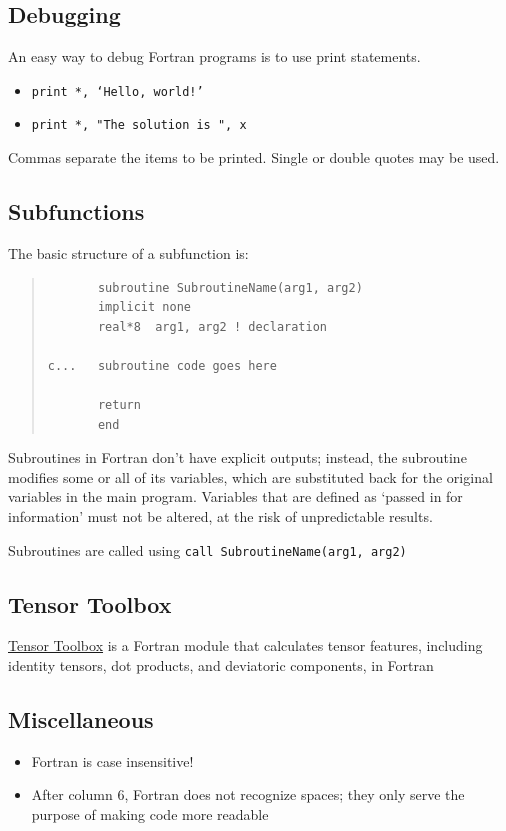 \documentclass[10pt,letterpaper,oneside]{report}
\begin{document}
\subsection{Debugging}
An easy way to debug Fortran programs is to use print statements. 
\begin{itemize}
\item \texttt{print *, `Hello, world!'}
\item \texttt{print *, "The solution is ", x}
\end{itemize} 
Commas separate the items to be printed.  Single or double quotes may be used.

\subsection{Subfunctions}
The basic structure of a subfunction is: 

\begin{quote} \begin{lstlisting}
       subroutine SubroutineName(arg1, arg2)
       implicit none
       real*8  arg1, arg2 ! declaration

c...   subroutine code goes here 

       return
       end
\end{lstlisting} \end{quote}

Subroutines in Fortran don't have explicit outputs; instead, the subroutine modifies some or all of its variables, which are substituted back for the original variables in the main program.  Variables that are defined as `passed in for information' must not be altered, at the risk of unpredictable results.

Subroutines are called using \texttt{call SubroutineName(arg1, arg2)}


\subsection{Tensor Toolbox}
\href{https://adtzlr.github.io/TensorToolbox/}{Tensor Toolbox} is a Fortran module that calculates tensor features, including identity tensors, dot products, and deviatoric components, in Fortran \cite{Dutzler}

\subsection{Miscellaneous}
\begin{itemize}
\item Fortran is case insensitive!  
\item After column 6, Fortran does not recognize spaces; they only serve the purpose of making code more readable
\end{itemize}
\end{document}
